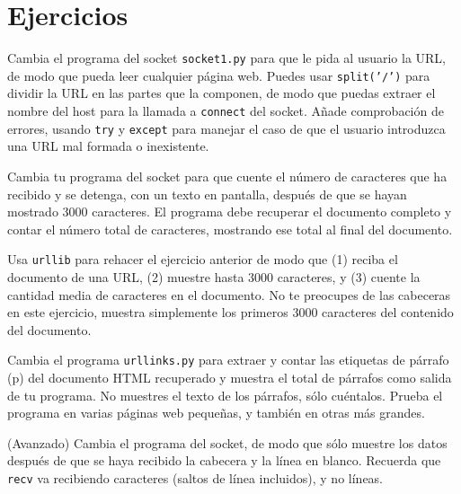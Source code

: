 \section{Ejercicios}

\begin{ex}
Cambia el programa del socket {\tt socket1.py} para que le pida al usuario
la URL, de modo que pueda leer cualquier página web.
Puedes usar {\tt split('/')} para dividir la URL en las partes que la componen,
de modo que puedas extraer el nombre del host para la llamada a {\tt connect} del socket.
Añade comprobación de errores, usando {\tt try} y {\tt except} para manejar el caso de que
el usuario introduzca una URL mal formada o inexistente.  
\end{ex}

\begin{ex}
Cambia tu programa del socket para que cuente el número de caracteres que ha recibido
y se detenga, con un texto en pantalla, después de que se hayan mostrado 3000 caracteres. El programa
debe recuperar el documento completo y contar el número total de caracteres,
mostrando ese total al final del documento.
\end{ex}

\begin{ex}
Usa {\tt urllib} para rehacer el ejercicio anterior de modo que (1) reciba el documento
de una URL, (2) muestre hasta 3000 caracteres, y (3) cuente la cantidad media
de caracteres en el documento. No te preocupes de las cabeceras en este ejercicio,
muestra simplemente los primeros 3000 caracteres del contenido del documento.
\end{ex}

\begin{ex}
Cambia el programa {\tt urllinks.py} para extraer y contar
las etiquetas de párrafo (p) del documento HTML recuperado y
muestra el total de párrafos como
salida de tu programa.
No muestres el texto de los párrafos, sólo cuéntalos.
Prueba el programa en varias páginas web pequeñas,
y también en otras más grandes.
\end{ex}

\begin{ex}
(Avanzado) Cambia el programa del socket, de modo que sólo muestre los datos
después de que se haya recibido la cabecera y la línea en blanco. Recuerda que {\tt recv}
va recibiendo caracteres (saltos de línea incluidos), y no líneas.
\end{ex}


